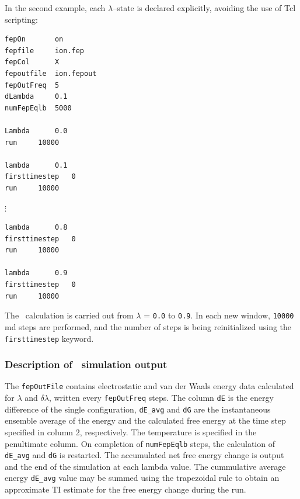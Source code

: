 In the second example, each $\lambda$--state is declared
explicitly, avoiding the use of {\sc Tcl} scripting:

\begin{verbatim}
fepOn		on  
fepfile		ion.fep
fepCol		X
fepoutfile	ion.fepout
fepOutFreq	5
dLambda		0.1
numFepEqlb	5000

Lambda		0.0
run		10000

lambda		0.1
firsttimestep	0
run		10000
\end{verbatim}
$\vdots$
\begin{verbatim}
lambda		0.8
firsttimestep	0
run		10000

lambda		0.9
firsttimestep	0
run		10000
\end{verbatim}

The \FEP\ calculation is carried out from $\lambda$ = {\tt 0.0} to
{\tt 0.9}. In each new window, {\tt 10000} {\sc md} steps are
performed, and the number of steps is being reinitialized using
the {\tt firsttimestep} keyword.



\subsubsection{Description of \FEP\ simulation output }

The {\tt fepOutFile} contains electrostatic and van der Waals energy
data calculated for $\lambda$ and $\delta\lambda$, written every
{\tt fepOutFreq} steps. The column {\tt dE} is the energy
difference of the single configuration, {\tt dE\_avg} and {\tt dG}
are the instantaneous ensemble average of the energy and the calculated
free energy at the time step specified in column 2, respectively.
The temperature is specified in the penultimate column. On completion
of {\tt numFepEqlb} steps, the calculation of {\tt dE\_avg} and 
{\tt dG} is restarted. The accumulated net free energy change is output
and the end of the simulation at each lambda value. The cummulative
average energy {\tt dE\_avg} value may be summed using the 
trapezoidal rule to obtain an approximate TI estimate for the free 
energy change during the run.


